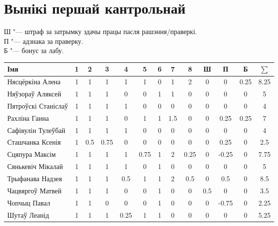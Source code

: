 


	\section{Вынікі першай кантрольнай}
	\noindent Ш "--- штраф за затрымку здачы працы пасля рашэння/праверкі. \\
	П "--- адзнака за праверку. \\
	Б "--- бонус за лабу.
\begin{table}[H]
	\begin{tabular}{|l|c|c|c|c|c|c|c|c|c|c|c|c|}
		\hline
		Імя                 & 1 & 2   & 3   & 4    & 5    & 6 & 7   & 8    & Ш   & П    & Б    & $\sum$ \\ \hline
		Нясцёркіна Алена    & 1 & 1   & 1   & 1    & 1    & 0 & 1   & 2    & 0   & 0    & 0.25 & 8.25                \\ \hline
		Няўзораў Аляксей    & 1 & 1   & 1   & 0    & 0    & 1 & 1   & 0    & 0   & 0    & 0    & 5                   \\ \hline
		Пятроўскі Станіслаў & 1 & 1   & 1   & 1    & 0    & 0 & 0   & 0    & 0   & 0    & 0    & 4                   \\ \hline
		Рахліна Ганна       & 1 & 1   & 1   & 0    & 1    & 1 & 1.5 & 0    & 0   & 0.25 & 0.25 & 7                   \\ \hline
		Сафівулін Тулеўбай  & 1 & 1   & 1   & 1    & 0    & 0 & 0   & 0    & 0   & 0    & 0    & 4                   \\ \hline
		Сташчанка Ксенія    & 1 & 0.5 & 0.75 & 0    & 0    & 0 & 0   & 0    & 0   & 0.25 & 0    & 2.5                \\ \hline
		Сцяпура Максім      & 1 & 1   & 1   & 1    & 0.75 & 1 & 2   & 0.25 & 0   & -0.25 & 0    & 7.75                 \\ \hline
		Сянькевіч Мікалай   & 1 & 1   & 1   & 1    & 0    & 1 & 0   & 0    & 0   & 0    & 0    & 5                   \\ \hline
		Трыфанава Надзея    & 1 & 1   & 1   & 0.5  & 1    & 1 & 2   & 0.5  & 0   & 0.5  & 0    & 8.5                 \\ \hline
		Чацвяргоў Матвей    & 1 & 1   & 1   & 0    & 0    & 1 & 0   & 0    & 0.5 & 0    & 0    & 3.5                 \\ \hline
		Чопчыц Павал        & 1 & 1   & 0   & 0    & 0    & 1 & 0   & 0    & 0   & -0.75   & 0    & 2.25                   \\ \hline
		Шутаў Леанід        & 1 & 1   & 1   & 0.25 & 1    & 1 & 0   & 0    & 0   & 0    & 0    & 5.25                \\ \hline
	\end{tabular}
\end{table}
	
